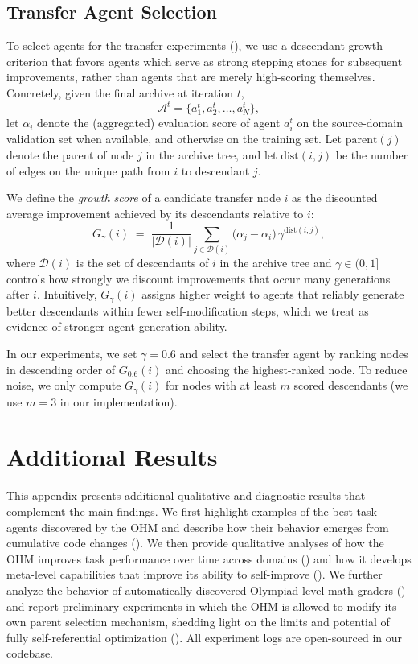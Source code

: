 \documentclass[]{fairmeta}
\begin{document}
\subsection{Transfer Agent Selection}
\label{app:transfer-selection}

To select agents for the transfer experiments (), we use a descendant growth criterion that favors agents which serve as strong stepping stones for subsequent improvements, rather than agents that are merely high-scoring themselves.
Concretely, given the final archive at iteration \(t\),
\[
\mathcal{A}^t = \{a_1^t, a_2^t, \dots, a_N^t\},
\]
let \(\alpha_i\) denote the (aggregated) evaluation score of agent \(a_i^t\) on the source-domain validation set when available, and otherwise on the training set.
Let \(\mathrm{parent}(j)\) denote the parent of node \(j\) in the archive tree, and let \(\mathrm{dist}(i,j)\) be the number of edges on the unique path from \(i\) to descendant \(j\).

We define the \emph{growth score} of a candidate transfer node \(i\) as the discounted average improvement achieved by its descendants relative to \(i\):
\[
G_\gamma(i)
\;=\;
\frac{1}{|\mathcal{D}(i)|}
\sum_{j \in \mathcal{D}(i)}
\bigl(\alpha_j - \alpha_i\bigr)\,\gamma^{\mathrm{dist}(i,j)},
\]
where \(\mathcal{D}(i)\) is the set of descendants of \(i\) in the archive tree and \(\gamma \in (0,1]\) controls how strongly we discount improvements that occur many generations after \(i\).
Intuitively, \(G_\gamma(i)\) assigns higher weight to agents that reliably generate better descendants within fewer self-modification steps, which we treat as evidence of stronger agent-generation ability.

In our experiments, we set \(\gamma = 0.6\) and select the transfer agent by ranking nodes in descending order of \(G_{0.6}(i)\) and choosing the highest-ranked node. To reduce noise, we only compute \(G_\gamma(i)\) for nodes with at least \(m\) scored descendants (we use \(m=3\) in our implementation).

\section{Additional Results}
\label{app:res}

This appendix presents additional qualitative and diagnostic results that complement the main findings. We first highlight examples of the best task agents discovered by the OHM and describe how their behavior emerges from cumulative code changes (). We then provide qualitative analyses of how the OHM improves task performance over time across domains () and how it develops meta-level capabilities that improve its ability to self-improve (). We further analyze the behavior of automatically discovered Olympiad-level math graders () and report preliminary experiments in which the OHM is allowed to modify its own parent selection mechanism, shedding light on the limits and potential of fully self-referential optimization (). All experiment logs are open-sourced in our codebase.
\end{document}
